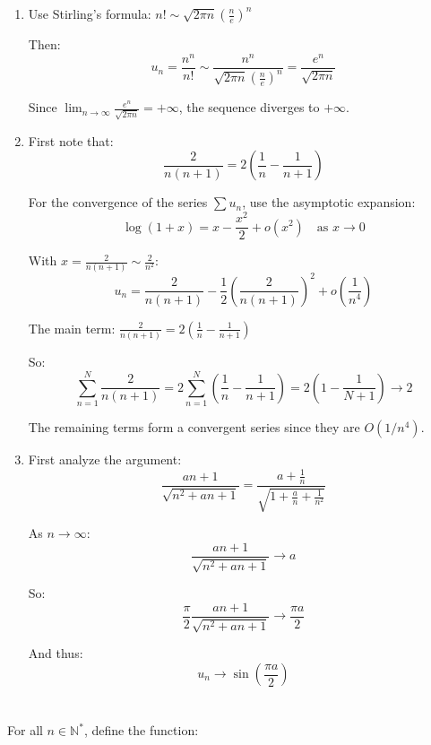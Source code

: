 \documentclass[12pt]{article}
\begin{document}
\begin{answerbox}
\begin{enumerate}
    \item[1)] Use Stirling's formula: $n! \sim \sqrt{2\pi n}\left(\frac{n}{e}\right)^n$
    
    Then:
    \[
    u_n = \frac{n^n}{n!} \sim \frac{n^n}{\sqrt{2\pi n}\left(\frac{n}{e}\right)^n} = \frac{e^n}{\sqrt{2\pi n}}
    \]
    
    Since $\lim_{n\to\infty} \frac{e^n}{\sqrt{2\pi n}} = +\infty$, the sequence diverges to $+\infty$.
    
    \item[2)] First note that:
    \[
    \frac{2}{n(n+1)} = 2\left(\frac{1}{n} - \frac{1}{n+1}\right)
    \]
    
    For the convergence of the series $\sum u_n$, use the asymptotic expansion:
    \[
    \log(1+x) = x - \frac{x^2}{2} + o(x^2) \quad \text{as } x \to 0
    \]
    
    With $x = \frac{2}{n(n+1)} \sim \frac{2}{n^2}$:
    \[
    u_n = \frac{2}{n(n+1)} - \frac{1}{2}\left(\frac{2}{n(n+1)}\right)^2 + o\left(\frac{1}{n^4}\right)
    \]
    
    The main term: $\frac{2}{n(n+1)} = 2\left(\frac{1}{n} - \frac{1}{n+1}\right)$
    
    So:
    \[
    \sum_{n=1}^N \frac{2}{n(n+1)} = 2\sum_{n=1}^N \left(\frac{1}{n} - \frac{1}{n+1}\right) = 2\left(1 - \frac{1}{N+1}\right) \to 2
    \]
    
    The remaining terms form a convergent series since they are $O(1/n^4)$.
    
    \item[3)] First analyze the argument:
    \[
    \frac{a n + 1}{\sqrt{n^2 + a n + 1}} = \frac{a + \frac{1}{n}}{\sqrt{1 + \frac{a}{n} + \frac{1}{n^2}}}
    \]
    
    As $n \to \infty$:
    \[
    \frac{a n + 1}{\sqrt{n^2 + a n + 1}} \to a
    \]
    
    So:
    \[
    \frac{\pi}{2} \frac{a n + 1}{\sqrt{n^2 + a n + 1}} \to \frac{\pi a}{2}
    \]
    
    And thus:
    \[
    u_n \to \sin\left(\frac{\pi a}{2}\right)
    \]
\end{enumerate}
\end{answerbox}

\section{}
For all \( n \in \mathbb{N}^* \), define the function:
\end{document}
